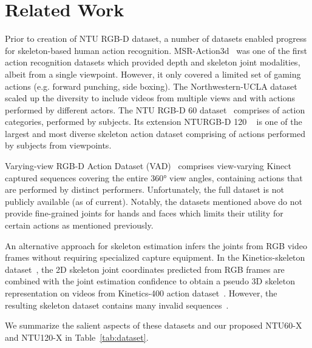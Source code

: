 \documentclass[sigconf,screen,prologue,table,dvipsnames]{acmart}
\begin{document}
\section{Related Work}
\label{sec:related}

Prior to creation of NTU RGB-D dataset, a number of datasets enabled progress for skeleton-based human action recognition. MSR-Action3d~\cite{li2010action} was one of the first action recognition datasets which provided depth and  skeleton joint modalities, albeit from a single viewpoint. However, it only covered a limited set of gaming actions (e.g. forward punching, side boxing). The Northwestern-UCLA dataset~\cite{wang2014crossview} scaled up the diversity to include videos from multiple views and with actions performed by  different actors. The NTU RGB-D 60 dataset~\cite{Shahroudy_2016_CVPR} comprises of  action categories, performed by  subjects. Its extension NTURGB-D 120 ~\cite{Liu_2019_NTURGBD120} is one of the largest and most diverse skeleton action dataset comprising of  actions performed by  subjects from  viewpoints.

 Varying-view RGB-D Action Dataset (VAD)~\cite{ji2019large} comprises view-varying Kinect captured sequences covering the entire \ang{360} view angles, containing  actions that are performed by  distinct performers. Unfortunately, the full dataset is not publicly available (as of current). Notably, the datasets mentioned above do not provide fine-grained joints for hands and faces which limits their utility for certain actions as mentioned previously. 
 
 An alternative approach for skeleton estimation infers the joints from RGB video frames without requiring specialized capture equipment. In the Kinetics-skeleton dataset~\cite{stgcn2018aaai}, the 2D skeleton joint coordinates predicted from RGB frames are combined with the joint estimation confidence to obtain a pseudo 3D skeleton representation on videos from Kinetics-400 action dataset~\cite{Carreira2017QuoVA}. However, the resulting skeleton dataset contains many invalid sequences~\cite{Gupta2021}.  
 
 We summarize the salient aspects of these datasets and our proposed NTU60-X and NTU120-X in Table~\ref{tab:dataset}.  
 
\end{document}
